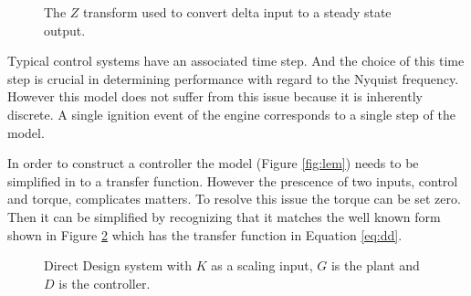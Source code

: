 \documentclass{article}
\begin{document}

\begin{figure}[!htbp]

\begin{center}
\end{center}

\caption{The $Z$ transform used to convert delta input to a steady
state output.}
\label{fig:dstf}

\end{figure}

Typical control systems have an associated time step.
And the choice of this time step is crucial in determining performance
with regard to the Nyquist frequency.
However this model does not suffer from this issue because it is
inherently discrete.
A single ignition event of the engine corresponds to a single
step of the model.

In order to construct a controller the model (Figure \ref{fig:lem})
needs to be simplified in to a transfer function.
However the prescence of two inputs, control and torque, complicates matters.
To resolve this issue the torque can be set zero.
Then it can be simplified by recognizing that it matches
the well known form shown in Figure \ref{fig:dd} which
has the transfer function in Equation \ref{eq:dd}.

\begin{figure}[h!]

\begin{center}
\end{center}

\caption{Direct Design system with $K$ as a scaling input, $G$ is
the plant and $D$ is the controller.}
\label{fig:dd}
\end{figure}
\end{document}
